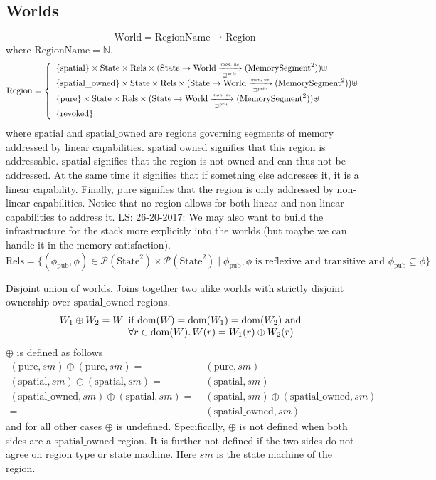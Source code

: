 \documentclass[a3paper]{article}
\newcommand\lau[1]{{\color{purple} \sf \footnotesize {LS: #1}}\\}
\newcommand{\dom}{\mathrm{dom}}
\newcommand{\powerset}[1]{\mathcal{P}(#1)}
\newcommand{\fun}{\rightarrow}
\newcommand{\parfun}{\rightharpoonup}
\newcommand{\tand}{\text{ and }}
\newcommand{\World}{\mathrm{World}}
\newcommand{\RegionName}{\mathrm{RegionName}}
\newcommand{\Region}{\mathrm{Region}}
\newcommand{\spatial}{\mathrm{spatial}}
\newcommand{\spatialo}{\mathrm{spatial\_owned}}
\newcommand{\pure}{\mathrm{pure}}
\newcommand{\revoked}{\mathrm{revoked}}
\newcommand{\State}{\mathrm{State}}
\newcommand{\Rels}{\mathrm{Rels}}
\newcommand{\UPred}[1]{\mathrm(#1)}
\newcommand{\future}{\sqsupseteq}
\newcommand{\pub}{\mathrm{pub}}
\newcommand{\privft}{\future^{\priv}}
\newcommand{\monprivnefun}{\xrightarrow[\text{\tiny{$\privft$}}]{\textit{\tiny{mon, ne}}}}
\newcommand{\nats}{\mathbb{N}}
\newcommand{\shareddom}[1]{\mathrm{#1}}
\newcommand{\MemSeg}{\shareddom{MemorySegment}}
\newcommand{\var}[1]{\mathit{#1}}
\newcommand{\priv}{\var{priv}}
\newcommand{\plainlinearity}[1]{\mathrm{#1}}
\newcommand{\linear}{\plainlinearity{linear}}
\begin{document}
\subsection{Worlds}
\[
  \World = \RegionName \parfun \Region
\]
where $\RegionName = \nats$.
\[
  \Region = \left\{
  \begin{array}{l}
    \{\spatial \} \times \State \times \Rels \times (\State \fun \World \monprivnefun \UPred{\MemSeg^2}) \uplus \\
    \{\spatialo \} \times \State \times \Rels \times (\State \fun \World \monprivnefun \UPred{\MemSeg^2})\uplus \\
    \{\pure \} \times \State \times \Rels \times (\State \fun \World \monprivnefun \UPred{\MemSeg^2}) \uplus\\
    \{\revoked\}
  \end{array} \right.
\]
where $\spatial$ and $\spatialo$ are regions governing segments of memory addressed by linear capabilities. $\spatialo$ signifies that this region is addressable. $\spatial$ signifies that the region is not owned and can thus not be addressed. At the same time it signifies that if something else addresses it, it is a $\linear$ capability. Finally, $\pure$ signifies that the region is only addressed by non-linear capabilities. Notice that no region allows for both linear and non-linear capabilities to address it.
\lau{26-20-2017: We may also want to build the infrastructure for the stack more explicitly into the worlds (but maybe we can handle it in the memory satisfaction).}
  \[
   \Rels = \{(\phi_\pub, \phi) \in \powerset{\State^2}\times \powerset{\State^2} \mid \phi_\pub, \phi \text{ is reflexive and transitive and } \phi_\pub \subseteq \phi \}
  \]


Disjoint union of worlds. Joins together two alike worlds with strictly disjoint ownership over $\spatialo$-regions.
\[
  W_1 \oplus W_2 = W
  \begin{array}[t]{l}
    \text{if $\dom(W) = \dom(W_1) = \dom(W_2) \tand$} \\
    \forall r \in \dom(W) \ldotp W(r) = W_1(r) \oplus W_2(r)
  \end{array}
\]
$\oplus$ is defined as follows
\begin{align*}
  (\pure,\var{sm}) \oplus (\pure,\var{sm}) =  & \; (\pure,\var{sm}) \\
  (\spatial,\var{sm}) \oplus (\spatial,\var{sm}) =  & \; (\spatial,\var{sm}) \\
  (\spatialo,\var{sm}) \oplus (\spatial,\var{sm}) = & \; (\spatial,\var{sm}) \oplus (\spatialo,\var{sm})\\
                                           =  & \; (\spatialo,\var{sm})
\end{align*}
and for all other cases $\oplus$ is undefined. Specifically, $\oplus$ is not defined when both sides are a $\spatialo$-region. It is further not defined if the two sides do not agree on region type or state machine. Here $\var{sm}$ is the state machine of the region.
\end{document}
